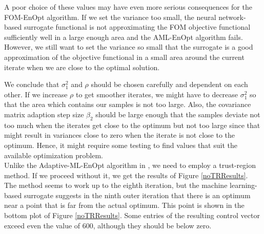 A poor choice of these values may have even more serious consequences for the FOM-EnOpt algorithm. If we set the variance too small, the neural network-based surrogate functional is not approximating the FOM objective functional sufficiently well in a large enough area and the AML-EnOpt algorithm fails. However, we still want to set the variance so small that the surrogate is a good approximation of the objective functional in a small area around the current iterate when we are close to the optimal solution.

We conclude that $\sigma^2_1$ and $\rho$ should be chosen carefully and dependent on each other. If we increase $\rho$ to get smoother iterates, we might have to decrease $\sigma^2_1$ so that the area which contains our samples is not too large. Also, the covariance matrix adaption step size $\beta_2$ should be large enough that the samples deviate not too much when the iterates get close to the optimum but not too large since that might result in variances close to zero when the iterate is not close to the optimum. Hence, it might require some testing to find values that suit the available optimization problem.\\

Unlike the Adaptive-ML-EnOpt algorithm in \cite{Keil2022-dj}, we need to employ a trust-region method. If we proceed without it, we get the results of Figure \ref{noTRResults}. The method seems to work up to the eighth iteration, but the machine learning-based surrogate suggests in the ninth outer iteration that there is an optimum near a point that is far from the actual optimum. This point is shown in the bottom plot of Figure \ref{noTRResults}. Some entries of the resulting control vector exceed even the value of $600$, although they should be below zero.\\


